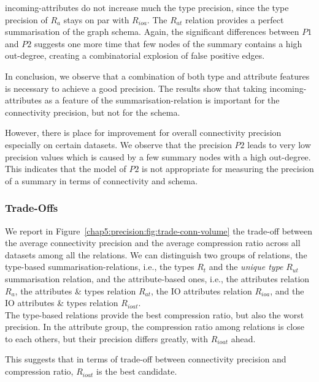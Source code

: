 \gls{incoming-attributes} do not increase much the type precision, since the type precision of $R_a$ stays on par with $R_{ioa}$. The $R_{at}$ relation provides a perfect summarisation of the graph schema. Again, the significant differences between $P1$ and $P2$ suggests one more time that few nodes of the summary contains a high out-degree, creating a combinatorial explosion of false positive edges.




In conclusion, we observe that a combination of both type and attribute features is necessary to achieve a good precision. The results show that taking \gls{incoming-attributes} as a feature of the \gls{summarisation-relation} is important for the connectivity precision, but not for the schema.

However, there is place for improvement for overall connectivity precision especially on certain datasets. We observe that the precision $P2$ leads to very low precision values which is caused by a few summary nodes with a high out-degree. This indicates that the model of $P2$ is not appropriate for measuring the precision of a summary in terms of connectivity and schema.

\subsubsection{Trade-Offs}

We report in Figure~\ref{chap5:precision:fig:trade-conn-volume} the trade-off between the average connectivity precision and the average compression ratio across all datasets among all the relations. We can distinguish two groups of relations, the type-based \glspl{summarisation-relation}, i.e., the types $R_t$ and the \emph{unique type} $R_{ut}$ summarisation relation, and the attribute-based ones, i.e., the attributes relation $R_a$, the attributes \& types relation $R_{at}$, the IO attributes relation $R_{ioa}$, and the IO attributes \& types relation $R_{ioat}$.\\

The type-based relations provide the best compression ratio, but also the worst precision. In the attribute group, the compression ratio among relations is close to each others, but their precision differs greatly, with $R_{ioat}$ ahead.

This suggests that in terms of trade-off between connectivity precision and compression ratio, $R_{ioat}$ is the best candidate.\\

